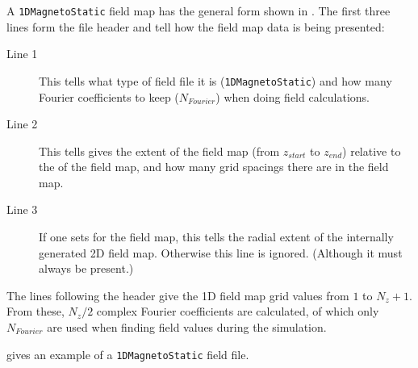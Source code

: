 A \texttt{1DMagnetoStatic} field map has the general form shown in . The first three lines form
the file header and tell \opalt how the field map data is being presented:

\begin{description}
\item[Line 1] This tells \opalt what type of field file it is (\texttt{1DMagnetoStatic}) and how many Fourier coefficients to
  keep ($N_{Fourier}$) when doing field calculations.
\item[Line 2] This tells gives the extent of the field map (from $z_{start}$ to $z_{end}$) relative to the  of
  the field map, and how many grid spacings there are in the field map.
\item[Line 3] If one sets  for the field map, this tells \opalt the radial extent of the internally
  generated 2D field map. Otherwise this line is ignored. (Although it must always be present.)
\end{description}

The lines following the header give the 1D field map grid values from $1$ to $N_{z} + 1$. From these, $N_{z}/2$
complex Fourier coefficients are calculated, of which only $N_{Fourier}$ are used when finding field values during the
simulation.

 gives an example of a \texttt{1DMagnetoStatic} field file.

\clearpage

